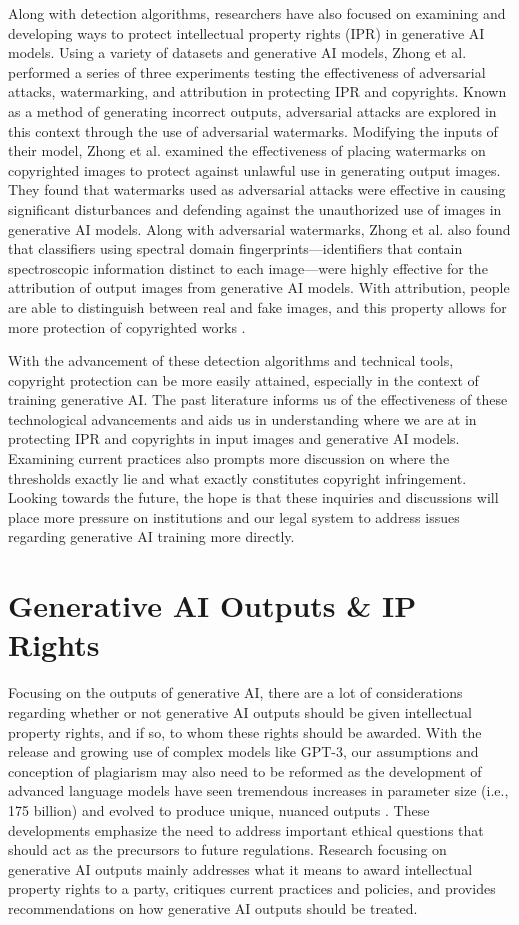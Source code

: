 \documentclass[manuscript,screen]{acmart}
\begin{document}
Along with detection algorithms, researchers have also focused on examining and developing ways to protect intellectual property rights (IPR) in generative AI models. Using a variety of datasets and generative AI models, Zhong et al. performed a series of three experiments testing the effectiveness of adversarial attacks, watermarking, and attribution in protecting IPR and copyrights. Known as a method of generating incorrect outputs, adversarial attacks are explored in this context through the use of adversarial watermarks. Modifying the inputs of their model, Zhong et al. examined the effectiveness of placing watermarks on copyrighted images to protect against unlawful use in generating output images. They found that watermarks used as adversarial attacks were effective in causing significant disturbances and defending against the unauthorized use of images in generative AI models. Along with adversarial watermarks, Zhong et al. also found that classifiers using spectral domain fingerprints—identifiers that contain spectroscopic information distinct to each image—were highly effective for the attribution of output images from generative AI models. With attribution, people are able to distinguish between real and fake images, and this property allows for more protection of copyrighted works \cite{PAPER:8}.

With the advancement of these detection algorithms and technical tools, copyright protection can be more easily attained, especially in the context of training generative AI. The past literature informs us of the effectiveness of these technological advancements and aids us in understanding where we are at in protecting IPR and copyrights in input images and generative AI models. Examining current practices also prompts more discussion on where the thresholds exactly lie and what exactly constitutes copyright infringement. Looking towards the future, the hope is that these inquiries and discussions will place more pressure on institutions and our legal system to address issues regarding generative AI training more directly. 

\section{Generative AI Outputs \& IP Rights}
Focusing on the outputs of generative AI, there are a lot of considerations regarding whether or not generative AI outputs should be given intellectual property rights, and if so, to whom these rights should be awarded. With the release and growing use of complex models like GPT-3, our assumptions and conception of plagiarism may also need to be reformed as the development of advanced language models have seen tremendous increases in parameter size (i.e., 175 billion) and evolved to produce unique, nuanced outputs \cite{PAPER:7}. These developments emphasize the need to address important ethical questions that should act as the precursors to future regulations. Research focusing on generative AI outputs mainly addresses what it means to award intellectual property rights to a party, critiques current practices and policies, and provides recommendations on how generative AI outputs should be treated. 
\end{document}
